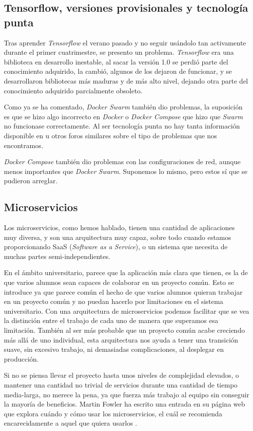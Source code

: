 \subsection{Tensorflow, versiones provisionales y tecnología punta}

Tras aprender \emph{Tensorflow} el verano pasado y no seguir usándolo tan activamente durante el primer cuatrimestre, se presento un problema. \emph{Tensorflow} era una biblioteca en desarrollo inestable, al sacar la versión 1.0 se perdió parte del conocimiento adquirido, la  cambió, algunos de los  dejaron de funcionar, y se desarrollaron bibliotecas más maduras y de más alto nivel, dejando otra parte del conocimiento adquirido parcialmente obsoleto.

Como ya se ha comentado, \emph{Docker Swarm} también dio problemas, la suposición es que se hizo algo incorrecto en \emph{Docker} o \emph{Docker Compose} que hizo que \emph{Swarm} no funcionase correctamente. Al ser tecnología punta no hay tanta información disponible en  u otros foros similares sobre el tipo de problemas que nos encontramos.

\emph{Docker Compose} también dio problemas con las configuraciones de red, aunque menos importantes que \emph{Docker Swarm}. Suponemos lo mismo, pero estos sí que se pudieron arreglar.


\subsection{Microservicios}

Los microservicios, como hemos hablado, tienen una cantidad de aplicaciones muy diversa, y son una arquitectura muy capaz, sobre todo cuando estamos proporcionando SaaS (\emph{Software as a Service}), o un sistema que necesita de muchas partes semi-independientes. 

En el ámbito universitario, parece que la aplicación más clara que tienen, es la de que varios alumnos sean capaces de colaborar en un proyecto común. Esto se introduce ya que parece común el hecho de que varios alumnos quieran trabajar en un proyecto común y no puedan hacerlo por limitaciones en el sistema universitario. Con una arquitectura de microservicios podemos facilitar que se vea la distinción entre el trabajo de cada uno de manera que superamos esa limitación. También al ser más probable que un proyecto común acabe creciendo más allá de uno individual, esta arquitectura nos ayuda a tener una transición suave, sin excesivo trabajo, ni demasiadas complicaciones, al desplegar en producción.

Si no se piensa llevar el proyecto hasta unos niveles de complejidad elevados, o mantener una cantidad no trivial de servicios durante una cantidad de tiempo media-larga, no merece la pena, ya que fuerza más trabajo al equipo sin conseguir la mayoría de beneficios. Martin Fowler ha escrito una entrada en su página web que explora cuándo y cómo usar los microservicios, el cuál se recomienda encarecidamente a aquel que quiera usarlos \cite{fow15}.